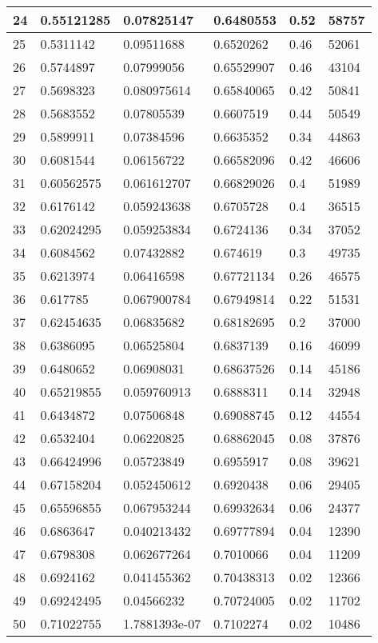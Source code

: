 \begin{longtable}{|l|l|l|l|l|l|}
24 & 0.55121285 & 0.07825147 & 0.6480553 & 0.52 & 58757 \\ \hline 
25 & 0.5311142 & 0.09511688 & 0.6520262 & 0.46 & 52061 \\ \hline 
26 & 0.5744897 & 0.07999056 & 0.65529907 & 0.46 & 43104 \\ \hline 
27 & 0.5698323 & 0.080975614 & 0.65840065 & 0.42 & 50841 \\ \hline 
28 & 0.5683552 & 0.07805539 & 0.6607519 & 0.44 & 50549 \\ \hline 
29 & 0.5899911 & 0.07384596 & 0.6635352 & 0.34 & 44863 \\ \hline 
30 & 0.6081544 & 0.06156722 & 0.66582096 & 0.42 & 46606 \\ \hline 
31 & 0.60562575 & 0.061612707 & 0.66829026 & 0.4 & 51989 \\ \hline 
32 & 0.6176142 & 0.059243638 & 0.6705728 & 0.4 & 36515 \\ \hline 
33 & 0.62024295 & 0.059253834 & 0.6724136 & 0.34 & 37052 \\ \hline 
34 & 0.6084562 & 0.07432882 & 0.674619 & 0.3 & 49735 \\ \hline 
35 & 0.6213974 & 0.06416598 & 0.67721134 & 0.26 & 46575 \\ \hline 
36 & 0.617785 & 0.067900784 & 0.67949814 & 0.22 & 51531 \\ \hline 
37 & 0.62454635 & 0.06835682 & 0.68182695 & 0.2 & 37000 \\ \hline 
38 & 0.6386095 & 0.06525804 & 0.6837139 & 0.16 & 46099 \\ \hline 
39 & 0.6480652 & 0.06908031 & 0.68637526 & 0.14 & 45186 \\ \hline 
40 & 0.65219855 & 0.059760913 & 0.6888311 & 0.14 & 32948 \\ \hline 
41 & 0.6434872 & 0.07506848 & 0.69088745 & 0.12 & 44554 \\ \hline 
42 & 0.6532404 & 0.06220825 & 0.68862045 & 0.08 & 37876 \\ \hline 
43 & 0.66424996 & 0.05723849 & 0.6955917 & 0.08 & 39621 \\ \hline 
44 & 0.67158204 & 0.052450612 & 0.6920438 & 0.06 & 29405 \\ \hline 
45 & 0.65596855 & 0.067953244 & 0.69932634 & 0.06 & 24377 \\ \hline 
46 & 0.6863647 & 0.040213432 & 0.69777894 & 0.04 & 12390 \\ \hline 
47 & 0.6798308 & 0.062677264 & 0.7010066 & 0.04 & 11209 \\ \hline 
48 & 0.6924162 & 0.041455362 & 0.70438313 & 0.02 & 12366 \\ \hline 
49 & 0.69242495 & 0.04566232 & 0.70724005 & 0.02 & 11702 \\ \hline 
50 & 0.71022755 & 1.7881393e-07 & 0.7102274 & 0.02 & 10486 \\ \hline 
\end{longtable}